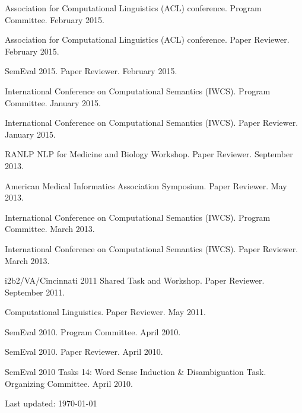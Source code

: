 \documentclass[letterpaper]{article}
\renewenvironment{itemize}{
  \begin{list}{}{
    \setlength{\leftmargin}{1.5em}
  }
}{
  \end{list}
}
\begin{document}
\begin{itemize}
\item Association for Computational Linguistics (ACL) conference. Program Committee. February 2015.
\item Association for Computational Linguistics (ACL) conference. Paper Reviewer. February 2015.
\item SemEval 2015. Paper Reviewer. February 2015.
\item International Conference on Computational Semantics (IWCS). Program Committee. January 2015.
\item International Conference on Computational Semantics (IWCS). Paper Reviewer. January 2015.
\item RANLP NLP for Medicine and Biology Workshop. Paper Reviewer. September 2013.
\item American Medical Informatics Association Symposium. Paper Reviewer. May 2013.
\item International Conference on Computational Semantics (IWCS). Program Committee. March 2013.
\item International Conference on Computational Semantics (IWCS). Paper Reviewer. March 2013.
\item i2b2/VA/Cincinnati 2011 Shared Task and Workshop. Paper Reviewer. September 2011.
\item Computational Linguistics. Paper Reviewer. May 2011.
\item SemEval 2010. Program Committee. April 2010.
\item SemEval 2010. Paper Reviewer. April 2010.
\item SemEval 2010 Tasks 14: Word Sense Induction \& Disambiguation Task. Organizing Committee. April 2010.
\end{itemize}

\bigskip

\begin{center}
\begin{footnotesize}
Last updated: \today \\
\end{footnotesize}
\end{center}
\end{document}
